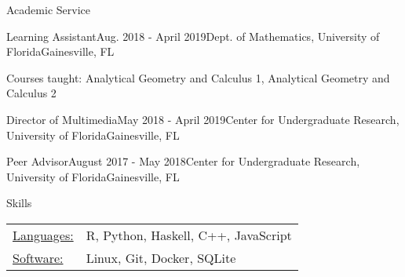 \documentclass{resume}
\begin{document}
 
\begin{rSection}{Academic Service}
  
\begin{rSubsection}{Learning Assistant}{Aug. 2018 - April
    2019}{Dept. of Mathematics, University of Florida}{Gainesville,
    FL}
   \item Courses taught: Analytical Geometry and Calculus 1, Analytical
    Geometry and Calculus 2
  \end{rSubsection}

 \begin{rSubsectionEmpty}{Director of Multimedia}{May 2018 - April 2019}{Center for Undergraduate Research, University of Florida}{Gainesville, FL}
\end{rSubsectionEmpty}


\begin{rSubsectionEmpty}{Peer Advisor}{August 2017 - May 2018}{Center for Undergraduate Research, University of Florida}{Gainesville, FL}
  \end{rSubsectionEmpty}

\end{rSection}
  

\begin{rSection}{Skills}
   \begin{tabular}{l p{3in}}
    \underline{Languages:} & R, Python, Haskell, C++, JavaScript \\
     \underline{Software:} & Linux, Git, Docker, SQLite
 \end{tabular}
\end{rSection}
\end{document}
